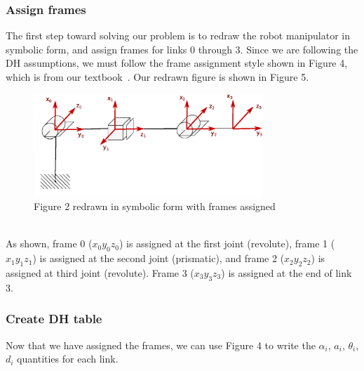 \documentclass[conference]{IEEEtran}
\begin{document}
\subsubsection{Assign frames}
The first step toward solving our problem is to redraw the robot
manipulator in symbolic
form, and assign frames for links 0 through 3. Since we are following the DH assumptions,
we must follow the frame assignment style shown in Figure 4, which
is from our textbook~\cite{Spong2006}. Our redrawn figure is shown in Figure 5.\\
\begin{figure}[h]
    \centering
    \includegraphics[width=3.4in]{prob3_5_redraw}
    \caption{Figure 2 redrawn in symbolic form with frames assigned}
\end{figure}\\
As shown, frame 0 ($x_0 y_0 z_0$) is assigned at the first joint (revolute), frame 1
($x_1 y_1 z_1$) is assigned at the
second joint (prismatic), and frame 2 ($x_2 y_2 z_2$)
 is assigned at third joint (revolute). Frame 3 ($x_3 y_3 z_3$) is assigned at
the end of link 3.\\

\subsubsection{Create DH table}
Now that we have assigned the frames, we can use Figure 4 to write
the $\alpha_i$, $a_i$, $\theta_i$, $d_i$ quantities for each link.

\begin{table}[h!]
    \begin{center}
    \end{center}
    \caption{Denavit-Hartenberg table for Problem 3--5}
\end{table}
\end{document}
